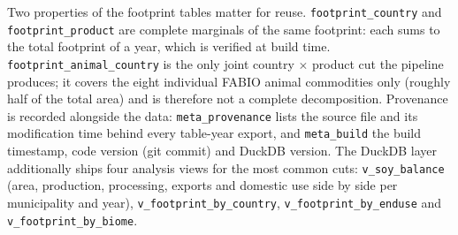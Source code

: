 \documentclass[pdflatex,sn-nature]{sn-jnl}%
\begin{document}
Two properties of the footprint tables matter for reuse.
\texttt{footprint\_country} and \texttt{footprint\_product} are
complete marginals of the same footprint: each sums to the total
footprint of a year, which is verified at build time.
\texttt{footprint\_animal\_country} is the only joint country
$\times$ product cut the pipeline produces; it covers the eight
individual FABIO animal commodities only (roughly half of the total
area) and is therefore not a complete decomposition. Provenance is
recorded alongside the data: \texttt{meta\_provenance} lists the
source file and its modification time behind every table-year export,
and \texttt{meta\_build} the build timestamp, code version (git
commit) and DuckDB version. The DuckDB layer additionally ships four
analysis views for the most common cuts: \texttt{v\_soy\_balance}
(area, production, processing, exports and domestic use side by side
per municipality and year), \texttt{v\_footprint\_by\_country},
\texttt{v\_footprint\_by\_enduse} and \texttt{v\_footprint\_by\_biome}.
\end{document}
